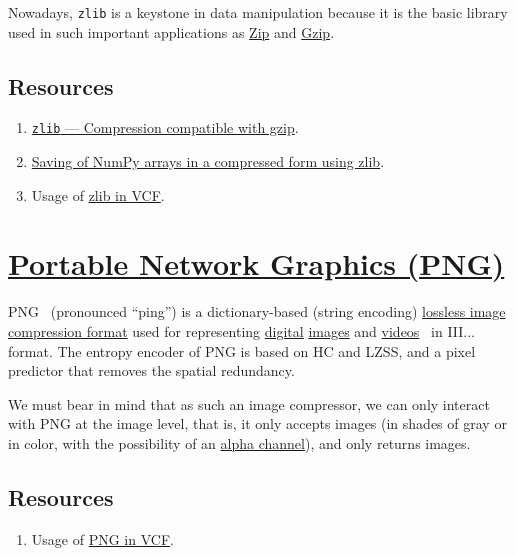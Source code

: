 Nowadays, \texttt{zlib} is a keystone in data manipulation because it
is the basic library used in such important applications as
\href{https://en.wikipedia.org/wiki/ZIP_(file_format)}{Zip} and
\href{https://en.wikipedia.org/wiki/Gzip}{Gzip}.

\subsection*{Resources}
\begin{enumerate}
\item \href{https://docs.python.org/3/library/zlib.html}{\texttt{zlib}
    — Compression compatible with gzip}.
\item \href{https://numpy.org/doc/stable/reference/generated/numpy.savez.html}{Saving of NumPy arrays in a compressed form using zlib}.
\item Usage of
  \href{https://github.com/Sistemas-Multimedia/VCF/blob/main/notebooks/z_lib.ipynb}{zlib
    in VCF}.
\end{enumerate}

\section{\href{https://en.wikipedia.org/wiki/Portable_Network_Graphics}{Portable Network Graphics (PNG)}}
PNG~\cite{vruiz__PNG} (pronounced ``ping'') is a dictionary-based
(string encoding)
\href{https://en.wikipedia.org/wiki/Lossless_compression}{lossless
  image compression format} used for representing
\href{https://en.wikipedia.org/wiki/Digital_data}{digital}
\href{https://en.wikipedia.org/wiki/Digital_image}{images} and
\href{https://en.wikipedia.org/wiki/Video}{videos}~\cite{vruiz__image_video}
in III... format. The entropy encoder
of PNG is based on HC and LZSS, and a pixel predictor that removes the
spatial redundancy.

We must bear in mind that as such an image compressor, we can only
interact with PNG at the image level, that is, it only accepts images
(in shades of gray or in color, with the possibility of an
\href{https://en.wikipedia.org/wiki/Alpha_compositing}{alpha channel}),
and only returns images.

\subsection*{Resources}
\begin{enumerate}
\item Usage of
  \href{https://github.com/Sistemas-Multimedia/VCF/blob/main/notebooks/PNG.ipynb}{PNG
    in VCF}.
\end{enumerate}

